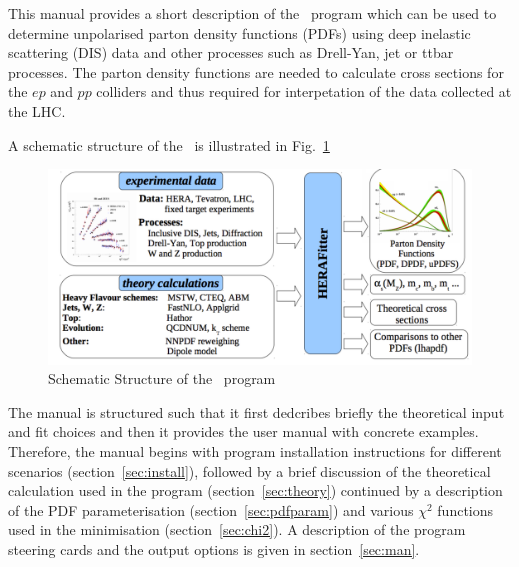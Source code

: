 \label{section:introduction}
This manual provides a short description of the \fitter\ program 
which can be used to determine unpolarised parton density functions 
(PDFs) using deep inelastic scattering (DIS) data and other processes such as 
Drell-Yan, jet or ttbar processes.
The parton density functions are needed to calculate cross sections
for the $ep$ and $pp$ colliders and thus required for interpetation
of the data collected at the LHC.

A schematic structure of the \fitter\ is illustrated in Fig.~\ref{fig:flow}
\begin{figure}
\begin{center}
\caption{Schematic Structure of the \fitter\ program}
\includegraphics[width=0.75\linewidth]{figures/flow.pdf}
\end{center}
\label{fig:flow}
\end{figure}

The manual is structured such that it first dedcribes briefly the theoretical input and fit choices
and then it provides the user manual with concrete examples.
Therefore, the manual begins with program installation instructions for different scenarios (section~\ref{sec:install}), followed by a brief discussion of the theoretical calculation
used in the program (section~\ref{sec:theory}) continued by a description of the
PDF parameterisation (section~\ref{sec:pdfparam}) and various $\chi^2$ functions used in the
minimisation (section~\ref{sec:chi2}). A description of the program steering cards and
the output options is given in section~\ref{sec:man}.

